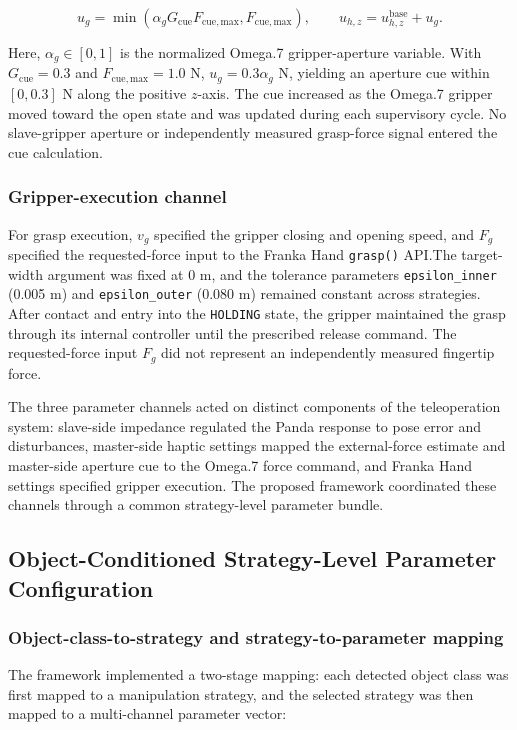 \begin{equation}
\label{eq:gripper-cue-command}
u_g=\min\!\left(\alpha_gG_{\mathrm{cue}}F_{\mathrm{cue,max}},F_{\mathrm{cue,max}}\right),
\qquad
u_{h,z}=u_{h,z}^{\mathrm{base}}+u_g.
\end{equation}

Here, $\alpha_g\in[0,1]$ is the normalized Omega.7 gripper-aperture variable. With $G_{\mathrm{cue}}=0.3$ and $F_{\mathrm{cue,max}}=1.0$ N, $u_g=0.3\alpha_g$ N, yielding an aperture cue within $[0,0.3]$ N along the positive $z$-axis. The cue increased as the Omega.7 gripper moved toward the open state and was updated during each supervisory cycle. No slave-gripper aperture or independently measured grasp-force signal entered the cue calculation.

\subsubsection{Gripper-execution channel}
For grasp execution, $v_g$ specified the gripper closing and opening speed, and $F_g$ specified the requested-force input to the Franka Hand \texttt{grasp()} API.\@ The target-width argument was fixed at 0 m, and the tolerance parameters \texttt{epsilon\_inner} (0.005 m) and \texttt{epsilon\_outer} (0.080 m) remained constant across strategies. After contact and entry into the \texttt{HOLDING} state, the gripper maintained the grasp through its internal controller until the prescribed release command. The requested-force input $F_g$ did not represent an independently measured fingertip force.

The three parameter channels acted on distinct components of the teleoperation system: slave-side impedance regulated the Panda response to pose error and disturbances, master-side haptic settings mapped the external-force estimate and master-side aperture cue to the Omega.7 force command, and Franka Hand settings specified gripper execution. The proposed framework coordinated these channels through a common strategy-level parameter bundle.

\subsection{Object-Conditioned Strategy-Level Parameter Configuration}
\subsubsection{Object-class-to-strategy and strategy-to-parameter mapping}
The framework implemented a two-stage mapping: each detected object class was first mapped to a manipulation strategy, and the selected strategy was then mapped to a multi-channel parameter vector:

